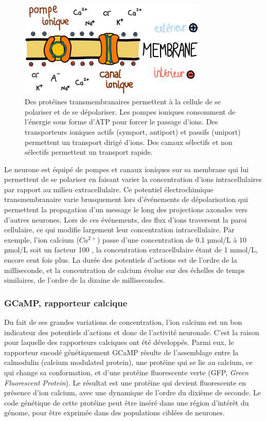 \begin{figure}
  \centering
  \includegraphics[width=0.8\textwidth]{./files/membrane.svg.png}
  \caption{Des protéines transmembranaires permettent à la cellule de se polariser et de se dépolariser. Les pompes ioniques consomment de l'énergie sous forme d'ATP pour forcer le passage d'ions. Des transporteurs ioniques actifs (symport, antiport) et passifs (uniport) permettent un transport dirigé d'ions. Des canaux sélectifs et non sélectifs permettent un transport rapide.}
  \end{figure}

Le neurone est équipé de pompes et canaux ioniques sur sa membrane qui lui permettent de se polariser en faisant varier la concentration d'ions intracellulaires par rapport au milieu extracellulaire. Ce potentiel électrochimique transmembranaire varie brusquement lors d'événements de dépolarisation qui permettent la propagation d'un message le long des projections axonales vers d'autres neurones. Lors de ces événements, des flux d'ions traversent la paroi cellulaire, ce qui modifie largement leur concentration intracellulaire. Par exemple, l'ion calcium ($Ca^{2+}$) passe d'une concentration de 0.1 µmol/L à 10 µmol/L soit un facteur 100 \cite{grienberger_imaging_2012}, la concentration extracellulaire étant de 1 mmol/L, encore cent fois plus. La durée des potentiels d'actions est de l'ordre de la milliseconde, et la concentration de calcium évolue sur des échelles de temps similaires, de l'ordre de la dizaine de millisecondes. %

\subsubsection{GCaMP, rapporteur calcique}

Du fait de ses grandes variations de concentration, l'ion calcium est un bon indicateur des potentiels d'actions et donc de l'activité neuronale. C'est la raison pour laquelle des rapporteurs calciques ont été développés. Parmi eux, le rapporteur encodé génétiquement GCaMP résulte de l'assemblage entre la calmodulin (calcium modulated protein), une protéine qui se lie au calcium, ce qui change sa conformation, et d'une protéine fluorescente verte (GFP, \emph{Green Fluorescent Protein}). Le résultat est une protéine qui devient fluorescente en présence d'ion calcium, avec une dynamique de l'ordre du dixième de seconde. Le code génétique de cette protéine peut être inséré dans une région d'intérêt du génome, pour être exprimée dans des populations ciblées de neurones.

